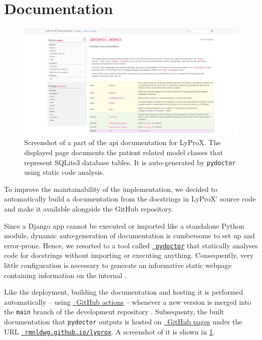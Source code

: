 \documentclass[\relativeRoot/main.tex]{subfiles}
\begin{document}
\section{Documentation}
\label{sec:lyprox:documentation}

\begin{figure}
    \centering
    \includegraphics[width=\textwidth, frame]{figures/docs.png}
    \caption[
        Documentation for LyProX
    ]{
        Screenshot of a part of the \acrshort{api} documentation for LyProX. The displayed page documents the patient related model classes that represent SQLite3 database tables. It is auto-generated by \texttt{pydoctor} \cite{hudson_pydoctor_2022} using static code analysis.
    }
    \label{fig:lyprox:documentation}
\end{figure}

To improve the maintainability of the implementation, we decided to automatically build a documentation from the docstrings in LyProX' source code and make it available alongside the GitHub repository.

Since a Django app cannot be executed or imported like a standalone Python module, dynamic auto-generation of documentation is cumbersome to set up and error-prone. Hence, we resorted to a tool called \href{https://pydoctor.readthedocs.io/en/latest/}{~\texttt{pydoctor}} \cite{hudson_pydoctor_2022} that statically analyses code for docstrings without importing or executing anything. Consequently, very little configuration is necessary to generate an informative static webpage containing information on the internal .

Like the deployment, building the documentation and hosting it is performed automatically -- using \href{https://github.com/features/actions}{~GitHub actions} -- whenever a new version is merged into the \texttt{main} branch of the development repository . Subsequenty, the built documentation that \texttt{pydoctor} outputs is hosted on \href{https://pages.github.com/}{~GitHub pages} under the URL \href{https://rmnldwg.github.io/lyprox}{~\texttt{rmnldwg.github.io/lyprox}}. A screenshot of it is shown in \cref{fig:lyprox:documentation}.
\end{document}
